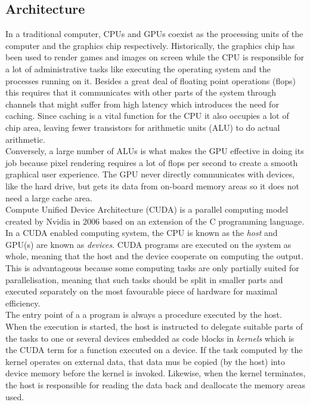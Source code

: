 
\subsection{Architecture}
In a traditional computer, CPUs and GPUs coexist as the processing units of the computer and the graphics chip respectively. Historically, the graphics chip has been used to render games and images on screen while the CPU is responsible for a lot of administrative tasks like executing the operating system and the processes running on it. Besides a great deal of floating point operations (flops) this requires that it communicates with other parts of the system through channels that might suffer from high latency which introduces the need for caching. Since caching is a vital function for the CPU it also occupies a lot of chip area, leaving fewer transistors for arithmetic units (ALU) to do actual arithmetic. \\

Conversely, a large number of ALUs is what makes the GPU effective in doing its job because pixel rendering requires a lot of flops per second to create a smooth graphical user experience. The GPU never directly communicates with devices, like the hard drive, but gets its data from on-board memory areas so it does not need a large cache area.\\

Compute Unified Device Architecture (CUDA) is a parallel computing model created by Nvidia in 2006 based on an extension of the C programming language. In a CUDA enabled computing system, the CPU is known as the \emph{host} and GPU(s) are known as \emph{devices}. CUDA programs are executed on the system as whole, meaning that the host and the device cooperate on computing the output. This is advantageous because some computing tasks are only partially suited for parallelisation, meaning that such tasks should be split in smaller parts and executed separately on the most favourable piece of hardware for maximal efficiency.\\

The entry point of a a program is always a procedure executed by the host. When the execution is started, the host is instructed to delegate suitable parts of the tasks to one or several devices embedded as code blocks in \emph{kernels} which is the CUDA term for a function executed on a device. If the task computed by the kernel operates on external data, that data mus be copied (by the host) into device memory before the kernel is invoked. Likewise, when the kernel terminates, the host is responsible for reading the data back and deallocate the memory areas used.\\

